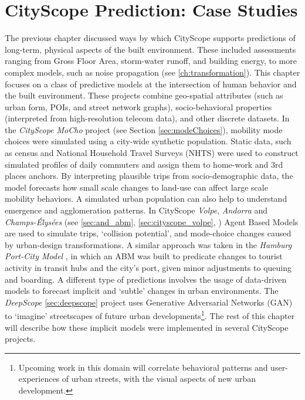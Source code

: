 {    \section{CityScope Prediction: Case Studies}
     {
      The previous chapter discussed ways by which CityScope supports predictions of long-term, physical aspects of the built environment. These included assessments ranging from Gross Floor Area, storm-water runoff, and building energy, to more complex models, such as noise propagation (see \eqref{ch:transformation}).
      \newline
      This chapter focuses on a class of predictive models at the intersection of human behavior and the built environment. These projects combine geo-spatial attributes (such as urban form, POIs, and street network graphs), socio-behavioral properties (interpreted from high-resolution telecom data), and other discrete datasets.
      In the \textit{CityScope MoCho} project (see Section \eqref{sec:modeChoices}), mobility mode choices were simulated using a city-wide synthetic population. Static data, such as census and National Household Travel Surveys (NHTS) were used to construct simulated profiles of daily commuters and assign them to home-work and 3rd places anchors. By interpreting plausible trips from socio-demographic data, the model forecasts how small scale changes to land-use can affect large scale mobility behaviors.
      \newline
      A simulated urban population can also help to understand emergence and agglomeration patterns. In CityScope \textit{Volpe}, \textit{Andorra} and \textit{Champs-Élysées} (see \eqref{sec:and_abm}, \eqref{sec:cityscope_volpe}, \cite{ChampsEl64:online}) Agent Based Models are used to simulate trips, `collision potential', and mode-choice changes caused by urban-design transformations. A similar approach was taken in the \textit{Hamburg Port-City Model} \cite{lopez2019testing}, in which an ABM was built to predicate changes to tourist activity in transit hubs and the city's port, given minor adjustments to queuing and boarding. A different type of predictions involves the usage of data-driven models to forecast implicit and `subtle' changes in urban environments. The \textit{DeepScope} \eqref{sec:deepscope} project uses Generative Adversarial Networks (GAN) to `imagine' streetscapes of future urban developments\footnote{Upcoming work in this domain will correlate behavioral patterns and user-experiences of urban streets, with the visual aspects of new urban development.}.
      \newline
      The rest of this chapter will describe how these implicit models were implemented in several CityScope projects.
     }

}

